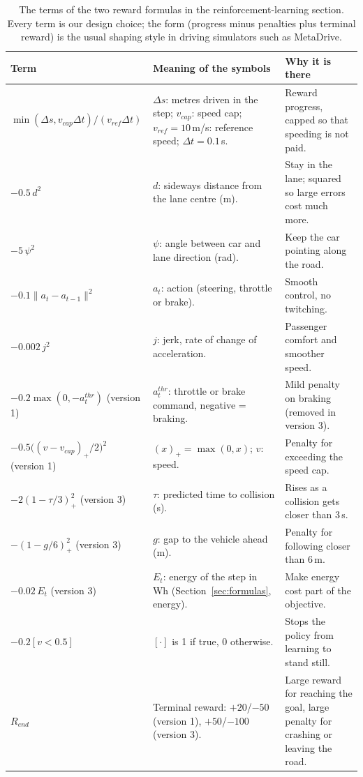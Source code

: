 \begin{table}[H]\centering\small
\caption{The terms of the two reward formulas in the reinforcement-learning section. Every term is our design choice; the form (progress minus penalties plus terminal reward) is the usual shaping style in driving simulators such as MetaDrive.}\label{tab:rewardterms}
\begin{tabularx}{\textwidth}{@{}>{\raggedright\arraybackslash}p{4.0cm}>{\raggedright\arraybackslash}p{4.9cm}X@{}}\toprule
Term & Meaning of the symbols & Why it is there\\\midrule
$\min(\Delta s, v_{cap}\Delta t)/(v_{ref}\Delta t)$ & $\Delta s$: metres driven in the step; $v_{cap}$: speed cap; $v_{ref}=10$\,m/s: reference speed; $\Delta t=0.1$\,s. & Reward progress, capped so that speeding is not paid.\\
$-0.5\,d^2$ & $d$: sideways distance from the lane centre (m). & Stay in the lane; squared so large errors cost much more.\\
$-5\,\psi^2$ & $\psi$: angle between car and lane direction (rad). & Keep the car pointing along the road.\\
$-0.1\lVert a_t-a_{t-1}\rVert^2$ & $a_t$: action (steering, throttle or brake). & Smooth control, no twitching.\\
$-0.002\,j^2$ & $j$: jerk, rate of change of acceleration. & Passenger comfort and smoother speed.\\
$-0.2\max(0,-a^{thr}_t)$ (version 1) & $a^{thr}_t$: throttle or brake command, negative = braking. & Mild penalty on braking (removed in version 3).\\
$-0.5\big((v-v_{cap})_+/2\big)^2$ (version 1) & $(x)_+=\max(0,x)$; $v$: speed. & Penalty for exceeding the speed cap.\\
$-2(1-\tau/3)_+^2$ (version 3) & $\tau$: predicted time to collision (s). & Rises as a collision gets closer than 3\,s.\\
$-(1-g/6)_+^2$ (version 3) & $g$: gap to the vehicle ahead (m). & Penalty for following closer than 6\,m.\\
$-0.02\,E_t$ (version 3) & $E_t$: energy of the step in Wh (Section~\ref{sec:formulas}, energy). & Make energy cost part of the objective.\\
$-0.2[v<0.5]$ & $[\cdot]$ is 1 if true, 0 otherwise. & Stops the policy from learning to stand still.\\
$R_{end}$ & Terminal reward: $+20$/$-50$ (version 1), $+50$/$-100$ (version 3). & Large reward for reaching the goal, large penalty for crashing or leaving the road.\\\bottomrule
\end{tabularx}
\end{table}

